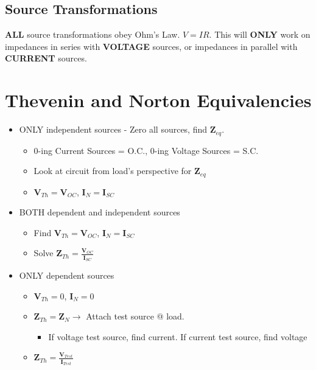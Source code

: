 \documentclass[10pt,letterpaper,final,twoside,notitlepage]{article}
\begin{document}
	\subsection*{Source Transformations} \label{sec:Source Transforms}
		\textbf{ALL} source transformations obey Ohm's Law. $V=IR$.
		This will \textbf{ONLY} work on impedances in series with \textbf{VOLTAGE} sources, or impedances in parallel with \textbf{CURRENT} sources.
		\vspace{-5mm}
		
\section*{Thevenin and Norton Equivalencies} \label{sec:Thevenin/Norton}
	\begin{itemize}[noitemsep, nolistsep]
		\item ONLY independent sources - Zero all sources, find $\mathbf{Z}_{eq}$.
		\begin{itemize}[noitemsep, nolistsep] %
			\item 0-ing Current Sources = O.C., 0-ing Voltage Sources = S.C.
			\item Look at circuit from load's perspective for $\mathbf{Z}_{eq}$
			\item $\mathbf{V}_{Th}=\mathbf{V}_{OC}$, $\mathbf{I}_{N} = \mathbf{I}_{SC}$
		\end{itemize}
		\item BOTH dependent and independent sources
			\begin{itemize}[noitemsep, nolistsep] %
				\item Find $\mathbf{V}_{Th}=\mathbf{V}_{OC}$, $\mathbf{I}_{N}=\mathbf{I}_{SC}$
				\item Solve $\mathbf{Z}_{Th}=\frac{\mathbf{V}_{OC}}{\mathbf{I}_{SC}}$
			\end{itemize}
		\item ONLY dependent sources
			\begin{itemize}[noitemsep, nolistsep] %
				\item $\mathbf{V}_{Th}=0$, $\mathbf{I}_{N}=0$
				\item $\mathbf{Z}_{Th}=\mathbf{Z}_{N} \rightarrow$ Attach test source @ load.
				\begin{itemize}
					\item If voltage test source, find current. If current test source, find voltage
				\end{itemize}
				\item $\mathbf{Z}_{Th}=\frac{\mathbf{V}_{Test}}{\mathbf{I}_{Test}}$
			\end{itemize}
		\end{itemize}
	\vspace{-5mm}
	
\end{document}
